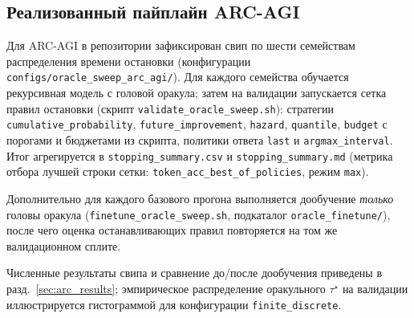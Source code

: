 \subsection{Реализованный пайплайн ARC-AGI}

Для ARC-AGI в репозитории зафиксирован свип по шести семействам распределения времени остановки (конфигурации \texttt{configs/oracle\_sweep\_arc\_agi/}). Для каждого семейства обучается рекурсивная модель с головой оракула; затем на валидации запускается сетка правил остановки (скрипт \texttt{validate\_oracle\_sweep.sh}): стратегии \texttt{cumulative\_probability}, \texttt{future\_improvement}, \texttt{hazard}, \texttt{quantile}, \texttt{budget} с порогами и бюджетами из скрипта, политики ответа \texttt{last} и \texttt{argmax\_interval}. Итог агрегируется в \texttt{stopping\_summary.csv} и \texttt{stopping\_summary.md} (метрика отбора лучшей строки сетки: \texttt{token\_acc\_best\_of\_policies}, режим \texttt{max}).

Дополнительно для каждого базового прогона выполняется дообучение \emph{только} головы оракула (\texttt{finetune\_oracle\_sweep.sh}, подкаталог \texttt{oracle\_finetune/}), после чего оценка останавливающих правил повторяется на том же валидационном сплите.

Численные результаты свипа и сравнение до/после дообучения приведены в разд.~\ref{sec:arc_results}; эмпирическое распределение оракульного \(\tau^\star\) на валидации иллюстрируется гистограммой для конфигурации \texttt{finite\_discrete}.


